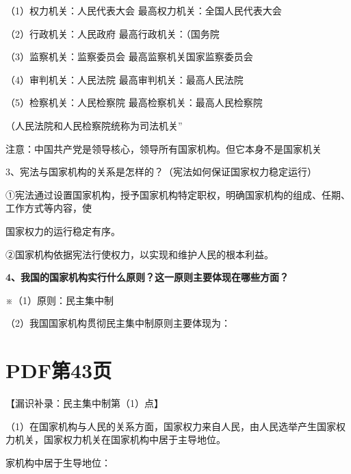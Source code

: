 \documentclass[lang=cn,11pt]{elegantbook}
\newcommand{\daofasym}[1]{{\daofasymbolfont #1}}
\newcommand{\daofasym}[1]{#1}
\begin{document}
（1）权力机关：人民代表大会 最高权力机关：全国人民代表大会\par

（2）行政机关：人民政府 最高行政机关：（国务院\par

（3）监察机关：监察委员会 最高监察机关国家监察委员会\par

（4）审判机关：人民法院 最高审判机关：最高人民法院\par

（5）检察机关：人民检察院 最高检察机关：最高人民检察院\par

（人民法院和人民检察院统称为司法机关”\par

注意：中国共产党是领导核心，领导所有国家机构。但它本身不是国家机关\par

3、宪法与国家机构的关系是怎样的？（宪法如何保证国家权力稳定运行）\par

\daofasym{①}宪法通过设置国家机构，授予国家机构特定职权，明确国家机构的组成、任期、工作方式等内容，使\par

国家权力的运行稳定有序。\par

\daofasym{②}国家机构依据宪法行使权力，以实现和维护人民的根本利益。\par

\textbf{4、我国的国家机构实行什么原则？这一原则主要体现在哪些方面？}\par

※（1）原则：民主集中制\par

（2）我国国家机构贯彻民主集中制原则主要体现为：\par


\section*{PDF第43页}

【漏识补录：民主集中制第（1）点】\par

（1）在国家机构与人民的关系方面，国家权力来自人民，由人民选举产生国家权力机关，国家权力机关在国家机构中居于主导地位。\par

家机构中居于生导地位：\par
\end{document}
